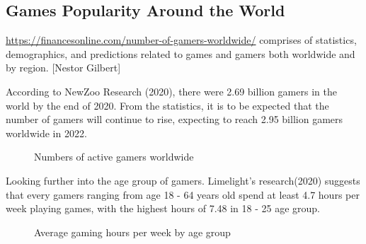 \medskip
\subsection{Games Popularity Around the World}
\url{https://financesonline.com/number-of-gamers-worldwide/}
comprises of statistics, demographics, and predictions related to games and gamers 
both worldwide and by region. [Nestor Gilbert]

According to NewZoo Research (2020), there were 2.69 billion gamers in the world by the end of 2020. From the statistics, it is to be expected that the number of gamers will continue to rise, expecting to reach 2.95 billion gamers worldwide in 2022.

\begin{figure}[!h]\centering
\setlength{\fboxrule}{0.2mm} %
\setlength{\fboxsep}{0.5mm}
\caption{Numbers of active gamers worldwide}\label{fig:model2}
\end{figure}

Looking further into the age group of gamers. Limelight's research(2020) suggests that every gamers ranging from age 18 - 64 years old spend at least 4.7 hours per week playing games, with the highest hours of 7.48 in 18 - 25 age group.

\begin{figure}[!h]\centering
\setlength{\fboxrule}{0.2mm} %
\setlength{\fboxsep}{0.5mm}
\caption{Average gaming hours per week by age group}\label{fig:model2}
\end{figure}

